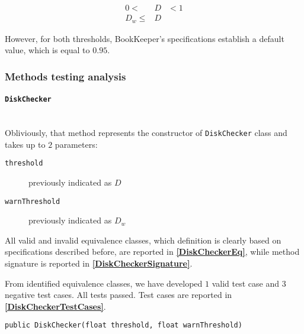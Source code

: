 \documentclass[sigconf]{acmart}
\begin{document}
\begin{eqnarray}
0  <  & D &  <  1 \nonumber \\
D_w  \leq  & D & 
\end{eqnarray}

However, for both thresholds, BookKeeper's specifications establish a default value, which is equal to $0.95$. 

\subsubsection{Methods testing analysis}

\paragraph{\texttt{DiskChecker}}
\hfill\\
Obliviously, that method represents the constructor of \texttt{DiskChecker} class and takes up to $2$ parameters:

\begin{description}
\item[\texttt{threshold}] previously indicated as $D$
\item[\texttt{warnThreshold}] previously indicated as $D_w$
\end{description}

All valid and invalid equivalence classes, which definition is clearly based on specifications described before, are reported in \textbf{\cref{DiskCheckerEq}}, while method signature is reported in \textbf{\cref{DiskCheckerSignature}}.

From identified equivalence classes, we have developed $1$ valid test case and $3$ negative test cases. All tests passed. Test cases are reported in \textbf{\cref{DiskCheckerTestCases}}. 

\begin{lstlisting}[frame=lines,basicstyle=\ttfamily\tiny, caption={Signature of method \texttt{DiskChecker}}, label={DiskCheckerSignature}]
public DiskChecker(float threshold, float warnThreshold)
\end{lstlisting}
\end{document}
